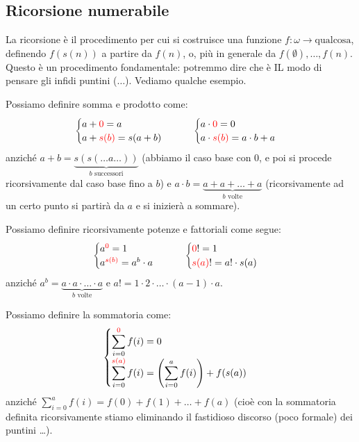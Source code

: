 \subsection{Ricorsione numerabile}
La ricorsione è il procedimento per cui si costruisce una funzione $f : \omega \rightarrow \text{qualcosa}$, definendo $f(s(n))$ a partire da $f(n)$, o,
più in generale da $f(\emptyset),\ldots,f(n)$. Questo è un procedimento fondamentale: potremmo dire che è IL modo di pensare gli infidi puntini ($\ldots$). Vediamo qualche esempio.

\begin{example}
	Possiamo definire somma e prodotto come:
	\[ \begin{cases}
		a + \textcolor{red}{0} = a \\
		a + \textcolor{red}{s(b)} = s(a + b)
	\end{cases}
	\qquad
	\begin{cases}
		a \cdot \textcolor{red}{0} = 0\\
		a \cdot \textcolor{red}{s(b)} = a \cdot b + a
	\end{cases}
		\]
	anziché $a + b = \underbrace{s(s(\ldots a \ldots))}_{\text{$b$ successori}}$ (abbiamo il caso base con 0, e poi si procede ricorsivamente dal caso base fino a $b$) e $a \cdot b = \underbrace{a + a + \ldots + a}_{\text{$b$ volte}}$ (ricorsivamente ad un certo 
	punto si partirà da $a$ e si inizierà a sommare).
\end{example}

\begin{example}
	Possiamo definire ricorsivamente potenze e fattoriali come segue:
	\[ \begin{cases}
		a^{\textcolor{red}{0}} = 1\\
		a^{\textcolor{red}{s(b)}} = a^b \cdot a
	\end{cases}
	\qquad
	\begin{cases}
		\textcolor{red}{0}! = 1\\
		\textcolor{red}{s(a)}! = a! \cdot s(a)
	\end{cases}
		\]
	anziché $a^b = \underbrace{a \cdot a \cdot \ldots \cdot a}_{\text{$b$ volte}}$ e $a! = 1 \cdot 2 \cdot \ldots \cdot (a - 1) \cdot a$.
\end{example}

\begin{example}
	[Sommatoria]
	Possiamo definire la sommatoria come:
	\[\begin{cases}
		\displaystyle
		\sum_{i = 0}^{\textcolor{red}{0}} f(i) = 0\\
		\displaystyle
		\sum_{i = 0}^{\textcolor{red}{s(a)}} f(i) = \left(\sum_{i=0}^{a} f(i) \right) + f(s(a))
	\end{cases}
		\]
	anziché $\displaystyle\sum_{i = 0}^a f(i) = f(0) + f(1) + \ldots + f(a)$ (cioè con la sommatoria definita ricorsivamente stiamo eliminando il fastidioso discorso (poco formale) dei puntini \dots).
\end{example}


